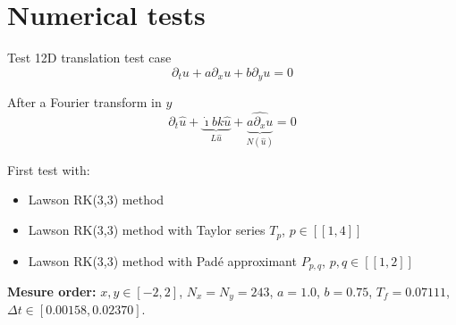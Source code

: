 \documentclass{beamer}
\newcommand{\mbold}[1]{{\textbf{\color{PLB}#1}}}
\newcommand{\I}{\dot{\imath}}
\begin{document}
\section{Numerical tests}
\begin{frame}{Test 1}{2D translation test case}
  $$\partial_t u + a\partial_x u + b\partial_y u = 0$$
  
  After a Fourier transform in $y$
  $$
    \partial_t \hat{u}
      + \underbrace{\I bk\hat{u}}_{L \hat{u}}
      + \underbrace{\widehat{a\partial_x u}}_{N(\hat{u})}
      = 0
  $$

  First test with:
  \begin{itemize}
    \item Lawson RK(3,3) method
    \item Lawson RK(3,3) method with Taylor series $T_p$, $p\in[\![1,4]\!]$
    \item Lawson RK(3,3) method with Padé approximant $P_{p,q}$, $p,q \in[\![1,2]\!]$
  \end{itemize}
  \mbold{Mesure order:} $x,y\in[-2,2]$, $N_x=N_y=243$, $a=1.0$, $b=0.75$, $T_f=0.07111$, $\Delta t\in[0.00158,0.02370]$.
\end{frame}
\end{document}

